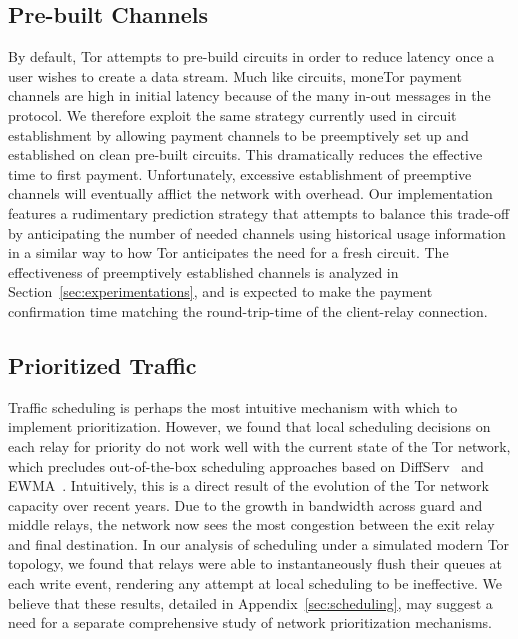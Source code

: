\subsection{Pre-built Channels} By default, Tor attempts to pre-build circuits in order to reduce latency once a user wishes to create a data stream.
Much like circuits, moneTor payment channels are high in initial latency because of the many in-out messages in the protocol.
We therefore exploit the same strategy currently used in circuit establishment by allowing payment channels to be preemptively set up and established on clean pre-built circuits.
This dramatically reduces the effective time to first payment.
Unfortunately, excessive establishment of preemptive channels will eventually afflict the network with overhead.
Our implementation features a rudimentary prediction strategy that attempts to balance this trade-off by anticipating the number of needed channels using historical usage information in a similar way to how Tor anticipates the need for a fresh circuit.
The effectiveness of preemptively established channels is analyzed in Section~\ref{sec:experimentations}, and is expected to make the payment confirmation time matching the round-trip-time of the client-relay connection.

\subsection{Prioritized Traffic}
\label{subsub:prioritized}

Traffic scheduling is perhaps the most intuitive mechanism with which to implement prioritization.
However, we found that local scheduling decisions on each relay for priority do not work well with the current state of the Tor network, which precludes out-of-the-box scheduling approaches based on DiffServ~\cite{dovrolis1999case} and EWMA~\cite{tang2010improved}.
Intuitively, this is a direct result of the evolution of the Tor network capacity over recent years.
Due to the growth in bandwidth across guard and middle relays, the network now sees the most congestion between the exit relay and final destination.
In our analysis of scheduling under a simulated modern Tor topology, we found that relays were able to instantaneously flush their queues at each write event, rendering any attempt at local scheduling to be ineffective.
We believe that these results, detailed in Appendix~\ref{sec:scheduling}, may suggest a need for a separate comprehensive study of network prioritization mechanisms.

